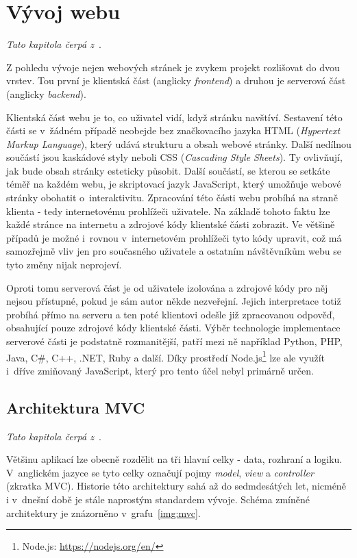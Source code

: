 \section{Vývoj webu}
\emph{Tato kapitola čerpá z~\cite{bib:web-development}}.

Z pohledu vývoje nejen webových stránek je zvykem projekt rozlišovat do dvou vrstev. Tou první je klientská část (anglicky \emph{frontend}) a druhou je serverová část (anglicky \emph{backend}).

Klientská část webu je to, co uživatel vidí, když stránku navštíví. Sestavení této části se v~žádném případě neobejde bez značkovacího jazyka HTML (\emph{Hypertext Markup Language}), který udává strukturu a obsah webové stránky. Další nedílnou součástí jsou kaskádové styly neboli CSS (\emph{Cascading Style Sheets}). Ty ovlivňují, jak bude obsah stránky esteticky působit. Další součástí, se kterou se setkáte téměř na každém webu, je skriptovací jazyk JavaScript, který umožňuje webové stránky obohatit o~interaktivitu.
Zpracování této části webu probíhá na straně klienta - tedy internetovému prohlížeči uživatele. Na základě tohoto faktu lze každé stránce na internetu  a zdrojové kódy klientské části zobrazit. Ve většině případů je možné i~rovnou v~internetovém prohlížeči tyto kódy upravit, což má samozřejmě vliv jen pro současného uživatele a ostatním návštěvníkům webu se tyto změny nijak neprojeví.

Oproti tomu serverová část je od uživatele izolována a zdrojové kódy pro něj nejsou přístupné, pokud je sám autor někde nezveřejní. Jejich interpretace totiž probíhá přímo na serveru a ten poté klientovi odešle již zpracovanou odpověď, obsahující pouze zdrojové kódy klientské části. Výběr technologie implementace serverové části je podstatně rozmanitější, patří mezi ně například Python, PHP, Java, C\#, C++, .NET, Ruby a další. Díky prostředí Node.js\footnote{Node.js: \url{https://nodejs.org/en/}} lze ale využít i~dříve zmiňovaný JavaScript, který pro tento účel nebyl primárně určen. 


\subsection{Architektura MVC}
\emph{Tato kapitola čerpá z~\cite{bib:mvc}}.

Většinu aplikací lze obecně rozdělit na tři hlavní celky - data, rozhraní a logiku. V~anglickém jazyce se tyto celky označují pojmy \emph{model}, \emph{view} a \emph{controller} (zkratka MVC). Historie této architektury sahá až do sedmdesátých let, nicméně i v~dnešní době je stále naprostým standardem vývoje. Schéma zmíněné architektury je znázorněno v~grafu~\ref{img:mvc}.

